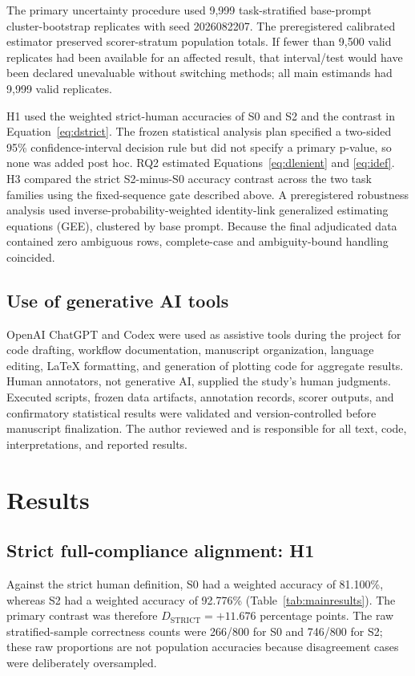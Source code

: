 \documentclass{BVP_AISC}
\begin{document}
The primary uncertainty procedure used 9,999 task-stratified base-prompt cluster-bootstrap replicates with seed 2026082207. The preregistered calibrated estimator preserved scorer-stratum population totals. If fewer than 9,500 valid replicates had been available for an affected result, that interval/test would have been declared unevaluable without switching methods; all main estimands had 9,999 valid replicates.

H1 used the weighted strict-human accuracies of S0 and S2 and the contrast in Equation~\eqref{eq:dstrict}. The frozen statistical analysis plan specified a two-sided 95\% confidence-interval decision rule but did not specify a primary p-value, so none was added post hoc. RQ2 estimated Equations~\eqref{eq:dlenient} and \eqref{eq:idef}. H3 compared the strict S2-minus-S0 accuracy contrast across the two task families using the fixed-sequence gate described above. A preregistered robustness analysis used inverse-probability-weighted identity-link generalized estimating equations (GEE), clustered by base prompt. Because the final adjudicated data contained zero ambiguous rows, complete-case and ambiguity-bound handling coincided.

\subsection{Use of generative AI tools}

OpenAI ChatGPT and Codex were used as assistive tools during the project for code drafting, workflow documentation, manuscript organization, language editing, LaTeX formatting, and generation of plotting code for aggregate results. Human annotators, not generative AI, supplied the study's human judgments. Executed scripts, frozen data artifacts, annotation records, scorer outputs, and confirmatory statistical results were validated and version-controlled before manuscript finalization. The author reviewed and is responsible for all text, code, interpretations, and reported results.

\section{Results}\label{sec:results}

\subsection{Strict full-compliance alignment: H1}

Against the strict human definition, S0 had a weighted accuracy of 81.100\%, whereas S2 had a weighted accuracy of 92.776\% (Table~\ref{tab:mainresults}). The primary contrast was therefore $D_{\mathrm{STRICT}}=+11.676$ percentage points. The raw stratified-sample correctness counts were 266/800 for S0 and 746/800 for S2; these raw proportions are not population accuracies because disagreement cases were deliberately oversampled.
\end{document}
